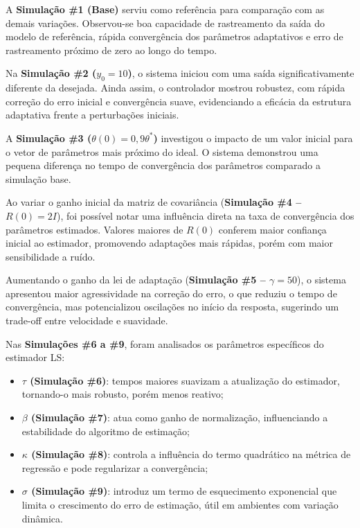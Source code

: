 \documentclass[10pt]{article}
\begin{document}
A \textbf{Simulação \#1 (Base)} serviu como referência para comparação com as demais variações. Observou-se boa capacidade de rastreamento da saída do modelo de referência, rápida convergência dos parâmetros adaptativos e erro de rastreamento próximo de zero ao longo do tempo.

Na \textbf{Simulação \#2 ($y_0 = 10$)}, o sistema iniciou com uma saída significativamente diferente da desejada. Ainda assim, o controlador mostrou robustez, com rápida correção do erro inicial e convergência suave, evidenciando a eficácia da estrutura adaptativa frente a perturbações iniciais.

A \textbf{Simulação \#3 ($\theta(0) = 0{,}9 \theta^*$)} investigou o impacto de um valor inicial para o vetor de parâmetros mais próximo do ideal. O sistema demonstrou uma pequena diferença no tempo de convergência dos parâmetros comparado a simulação base.

Ao variar o ganho inicial da matriz de covariância (\textbf{Simulação \#4 -- $R(0) = 2I$}), foi possível notar uma influência direta na taxa de convergência dos parâmetros estimados. Valores maiores de $R(0)$ conferem maior confiança inicial ao estimador, promovendo adaptações mais rápidas, porém com maior sensibilidade a ruído.

Aumentando o ganho da lei de adaptação (\textbf{Simulação \#5 -- $\gamma = 50$}), o sistema apresentou maior agressividade na correção do erro, o que reduziu o tempo de convergência, mas potencializou oscilações no início da resposta, sugerindo um trade-off entre velocidade e suavidade.

Nas \textbf{Simulações \#6 a \#9}, foram analisados os parâmetros específicos do estimador LS:
\begin{itemize}
    \item \textbf{$\tau$ (Simulação \#6)}: tempos maiores suavizam a atualização do estimador, tornando-o mais robusto, porém menos reativo;
    \item \textbf{$\beta$ (Simulação \#7)}: atua como ganho de normalização, influenciando a estabilidade do algoritmo de estimação;
    \item \textbf{$\kappa$ (Simulação \#8)}: controla a influência do termo quadrático na métrica de regressão e pode regularizar a convergência;
    \item \textbf{$\sigma$ (Simulação \#9)}: introduz um termo de esquecimento exponencial que limita o crescimento do erro de estimação, útil em ambientes com variação dinâmica.
\end{itemize}
\end{document}
